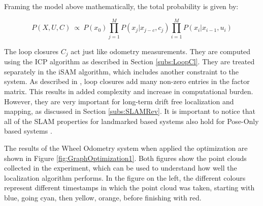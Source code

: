 \documentclass[11pt]{article}
\begin{document}
Framing the model above mathematically, the total probability is given by:

\begin{equation}
P(X,U,C)\ \propto \ P(x_0)\prod_{j=1}^{M}P(x_j|x_{j-c},c_j)\prod_{i=1}^{M}P(x_i|x_{i-1}, u_i)
\label{eq:probSLAM2}
\end{equation}
	
The loop closures $C_j$ act just like odometry measurements. They are computed using the ICP algorithm as described in Section \ref{subs:LoopCl}. They are treated separately in the iSAM algorithm, which includes another constraint to the system. As described in \cite{Kaess08tro}, loop closures add many non-zero entries in the factor matrix. This results in added complexity and increase in computational burden. However, they are very important for long-term drift free localization and mapping, as discussed in Section \ref{subs:SLAMRev}. It is important to notice that all of the SLAM properties for landmarked based systems also hold for Pose-Only based systems \cite{Kaess08tro}.
	
The results of the Wheel Odometry system when applied the optimization are shown in Figure \ref{fig:GraphOptimization1}. Both figures show the  point clouds collected in the experiment, which can be used to understand how well the localization algorithm performs. In the figure on the left, the different colours represent different timestamps in which the point cloud was taken, starting with blue, going cyan, then yellow, orange, before finishing with red.
	
\end{document}
